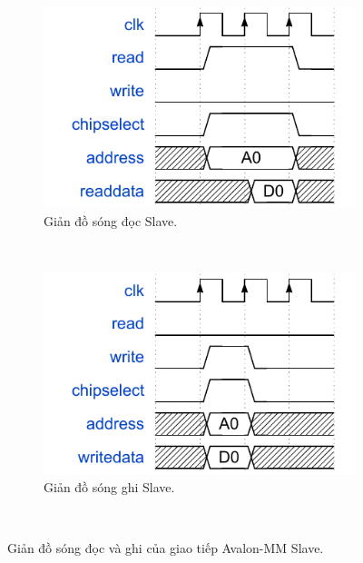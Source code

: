 \begin{enumerate}
    \begin{figure}[htbp]
        \centering
        \begin{subfigure}[b]{0.48\textwidth}
            \centering
            \includegraphics[width=\linewidth]{Images/02_03_AvalonSlave_ReadWaveform.pdf}
            \caption{Giản đồ sóng đọc Slave.}
            \label{fig:02_03_avalon_slave_read_sub}
        \end{subfigure}
        \hfill
        \begin{subfigure}[b]{0.48\textwidth}
            \centering
            \includegraphics[width=\linewidth]{Images/02_04_AvalonSlave_WriteWaveform.pdf}
            \caption{Giản đồ sóng ghi Slave.}
            \label{fig:02_04_avalon_slave_write_sub}
        \end{subfigure}
        \caption{Giản đồ sóng đọc và ghi của giao tiếp Avalon-MM Slave.}
        \label{fig:avalon_slave_waveforms}
    \end{figure}


\end{enumerate}
